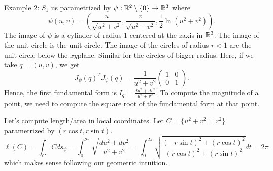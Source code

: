 Example 2: $S_1$ us parametrized by $\psi : \mathbb{R}^2 \setminus \{0\} \to \mathbb{R}^3$ where
$$\psi(u,v) = \left(\frac{u}{\sqrt{u^2+v^2}}, \frac{v}{\sqrt{u^2+v^2}}, \frac{1}{2}\ln(u^2 + v^2)\right).$$
The image of $\psi$ is a cylinder of radius 1 centered at the $z$axis in $\mathbb{R}^3$. The image of the unit circle is the unit circle. The image of the circles of radius $r < 1$ are the unit circle below the $xy$plane. Similar for the circles of bigger radius. Here, if we take $q = (u,v)$, we get
$$J_{\psi}(q)^TJ_{\psi}(q) = \frac{1}{u^2 + v^2}\begin{pmatrix}
    1 & 0 \\ 0 & 1
\end{pmatrix}.$$
Hence, the first fundamental form is $I_q = \frac{du^2 + dv^2}{u^2 + v^2}$. To compute the magnitude of a point, we need to compute the square root of the fundamental form at that point.

Let's compute length/area in local coordinates. Let $C = \{u^2 + v^2 = r^2\}$ parametrized by $(r\cos t, r\sin t)$.
$$\ell(C) = \int_C Cds_{\psi} = \int_{0}^{2\pi}\sqrt{\frac{du^2 + dv^2}{u^2 + v^2}} = \int_{0}^{2\pi}\sqrt{\frac{(-r\sin t)^2 + (r\cos t)^2}{(r\cos t)^2 + (r\sin t)^2}}dt = 2\pi$$
which makes sense following our geometric intuition. \\

\td \td \td \td \td\\
